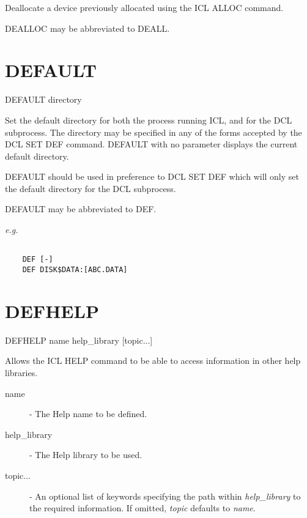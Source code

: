 \documentclass[twoside,11pt]{report}
\newcommand{\xlabel}[1]{}
\begin{document}
 Deallocate a device previously allocated using the ICL ALLOC command.

 DEALLOC may be abbreviated to DEALL.

\section{\xlabel{DEFAULT}DEFAULT\label{DEFAULT}}

   DEFAULT \hspace{.5cm} directory

 Set the default directory for both the process running ICL, and for the
 DCL subprocess. The directory may be specified in any of the forms
 accepted by the DCL  SET DEF command. DEFAULT with no parameter
 displays the current default directory.

 DEFAULT should be used in preference to DCL SET DEF which will only
 set the default directory for the DCL subprocess.

 DEFAULT may be abbreviated to DEF.

{\em e.g.}
\begin{verbatim}

    DEF [-]
    DEF DISK$DATA:[ABC.DATA]

\end{verbatim}

\section{\xlabel{DEFHELP}DEFHELP\label{DEFHELP}}

   DEFHELP \hspace{.5cm} name \hspace{.5cm} help\_library \hspace{.5cm} 
[topic...]

 Allows the ICL HELP command to be able to access information in other 
 help libraries.

\begin{description}

 \item[name] - The Help name to be defined.

 \item[help\_library] - The Help library to be used.

 \item[topic...] - An optional list of keywords specifying the path within
{\em help\_library} to the required information. If omitted, {\em topic} 
defaults to {\em name}.

\end{description}
\end{document}
